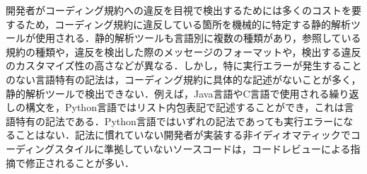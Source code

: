 \documentclass[T,J]{fose} %
\newcommand{\todo}[1]{\colorbox{yellow}{{\bf TODO}:}{\color{red} {\textbf{[#1]}}}}
\begin{document}
開発者がコーディング規約への違反を目視で検出するためには多くのコストを要するため，コーディング規約に違反している箇所を機械的に特定する静的解析ツールが使用される\cite{AnalysisoftheTools}．静的解析ツールも言語別に複数の種類があり，参照している規約の種類や，違反を検出した際のメッセージのフォーマットや，検出する違反のカスタマイズ性の高さなどが異なる．しかし，特に実行エラーが発生することのない言語特有の記法は，コーディング規約に具体的な記述がないことが多く，静的解析ツールで検出できない．例えば，Java言語やC言語で使用される繰り返しの構文を，Python言語ではリスト内包表記で記述することができ，これは言語特有の記法である．Python言語ではいずれの記法であっても実行エラーになることはない．記法に慣れていない開発者が実装する非イディオマティックでコーディングスタイルに準拠していないソースコードは，コードレビューによる指摘で修正されることが多い\cite{idiom}．





\end{document}
